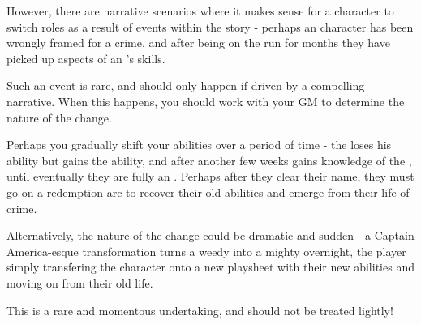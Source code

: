 However, there are narrative scenarios where it makes sense for a character to switch roles as a result of events within the story - perhaps an  character has been wrongly framed for a crime, and after being on the run for months they have picked up aspects of an 's skills. 

Such an event is rare, and should only happen if driven by a compelling narrative. When this happens, you should work with your GM to determine the nature of the change. 

Perhaps you gradually shift your abilities over a period of time - the  loses his  ability but gains the  ability, and after another few weeks gains knowledge of the , until eventually they are fully an . Perhaps after they clear their name, they must go on a redemption arc to recover their old abilities and emerge from their life of crime.

Alternatively, the nature of the change could be dramatic and sudden - a Captain America-esque transformation turns a weedy  into a mighty  overnight, the player simply transfering the character onto a new playsheet with their new abilities and moving on from their old life. 

This is a rare and momentous undertaking, and should not be treated lightly!

